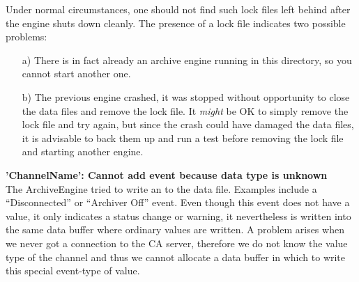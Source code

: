 Under normal circumstances, one should not find such lock files
left behind after the engine shuts down cleanly. The presence of
a lock file indicates two possible problems:
\begin{enumerate}
\item[a)] There is in fact already an archive engine running in
this directory, so you cannot start another one.
\item[b)] The previous engine crashed, it was stopped without
opportunity to close the data files and remove the lock file.
It \emph{might} be OK to simply remove the lock file and try
again, but since the crash could have damaged the data files, it
is advisable to back them up and run a test before removing the
lock file and starting another engine.
\end{enumerate}

\noindent
\textbf{'ChannelName': Cannot add event because data type is unknown}\\
The ArchiveEngine tried to write an  to the data
file. Examples include a ``Disconnected'' or ``Archiver Off''
event. Even though this event does not have a value, it only
indicates a status change or warning, it nevertheless is written
into the same data buffer where ordinary values are written.
A problem arises when we never got a connection to the CA
server, therefore we do not know the value type of the channel
and thus we cannot allocate a data buffer in which to write this
special event-type of value.

